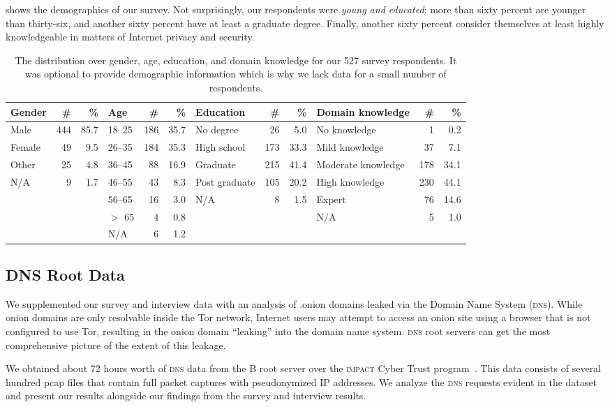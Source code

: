  shows the demographics of our survey.  Not
surprisingly, our respondents were \emph{young and educated}: more than sixty
percent are younger than thirty-six, and another sixty percent have at least a
graduate degree.  Finally, another sixty percent consider themselves at least
highly knowledgeable in matters of Internet privacy and security.

\begin{table*}[t]
	\centering
	\caption{The distribution over gender, age, education, and domain knowledge
	for our 527 survey respondents.  It was optional to provide demographic
	information which is why we lack data for a small number of respondents.}
	\label{tab:survey-demo}
	\begin{tabular}{l r r | l r r | l r r | l r r}
	\toprule
	Gender & \# & \% &
	Age & \# & \% &
	Education & \# & \% &
	Domain knowledge & \# & \% \\
	\midrule
	Male   & 444 & 85.7 & 18--25 & 186 & 35.7 & No degree     &  26 & 5.0  & No knowledge       &   1 & 0.2  \\
	Female &  49 &  9.5 & 26--35 & 184 & 35.3 & High school   & 173 & 33.3 & Mild knowledge     &  37 & 7.1  \\
	Other  &  25 &  4.8 & 36--45 &  88 & 16.9 & Graduate      & 215 & 41.4 & Moderate knowledge & 178 & 34.1 \\
	N/A    &   9 &  1.7 & 46--55 &  43 &  8.3 & Post graduate & 105 & 20.2 & High knowledge     & 230 & 44.1 \\
	       &     &      & 56--65 &  16 &  3.0 & N/A           &   8 &  1.5 & Expert             &  76 & 14.6 \\
	       &     &      & $>$ 65 &   4 &  0.8 &               &     &      & N/A                &   5 &  1.0 \\
	       &     &      & N/A    &   6 &  1.2 &               &     &      &                    &     & \\
	\bottomrule
	\end{tabular}
\end{table*}

\subsection{DNS Root Data}
\label{sec:root-data}

We supplemented our survey and interview data with an analysis of .onion domains
leaked via the Domain Name System (\textsc{dns}).  While onion domains are only
resolvable inside the Tor network, Internet users may attempt to access an onion
site using a browser that is not configured to use Tor, resulting in the onion
domain ``leaking'' into the domain name system.  \textsc{dns} root servers can
get the most comprehensive picture of the extent of this leakage.

We obtained about 72 hours worth of \textsc{dns} data from the B root server
over the \textsc{impact} Cyber Trust program~\cite{b_root}.  This data consists
of several hundred pcap files that contain full packet captures with
pseudonymized IP addresses.  We analyze the \textsc{dns} requests evident in the
dataset and present our results alongside our findings from the survey and
interview results.
